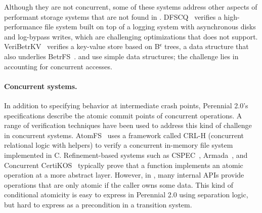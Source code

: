 Although they are not concurrent, some of these systems address other
aspects of performant storage systems that are not found in \txn.
DFSCQ~\cite{chen:dfscq} verifies a high-performance file system built
on top of a logging system with asynchronous disks and log-bypass
writes, which are challenging optimizations that \txn does not
support. VeriBetrKV~\cite{hance:veribetrkv} verifies a key-value store
based on B\textsuperscript{$\epsilon$} trees, a data structure that also underlies BetrFS~\cite{jannen:betrfs}. \txn
and \simplenfs use simple data structures;
the challenge lies in accounting for concurrent accesses.


\paragraph{Concurrent systems.}

In addition to specifying behavior at intermediate crash points, Perennial 2.0's
specifications describe the atomic commit points of concurrent operations. A
range of verification techniques have been used to address this kind of
challenge in concurrent systems. AtomFS~\cite{zou:atomfs} uses a framework
called CRL-H (concurrent relational logic with helpers) to verify a concurrent
in-memory file system implemented in C. Refinement-based systems such as
CSPEC~\cite{chajed:cspec}, Armada~\cite{lorch:armada}, and Concurrent
CertiKOS~\cite{gu:certikos-ccal} typically prove that a function implements an
atomic operation at a more abstract layer.
However, in \txn, many internal APIs provide operations that are only atomic if
the caller owns some data. This kind of conditional atomicity is easy to express
in Perennial 2.0 using separation logic, but hard to express
as a precondition in a transition system.

